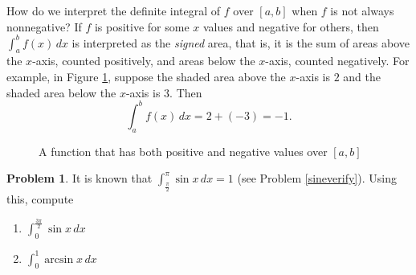\documentclass[12pt,letterpaper]{book}
\numberwithin{equation}{section}
\theoremstyle{definition}
\newtheorem{problem}[thm]{\textbf{Problem}}
\begin{document}
How do we interpret the definite integral of $f$ over $[a,b]$ when $f$ is not always nonnegative? If $f$ is positive for some $x$ values and negative for others, then $\displaystyle{\int_a^b f(x)\,dx}$ is interpreted as the \textit{signed} area, that is, it is the sum of areas above the $x$-axis, counted positively, and areas below the $x$-axis, counted negatively. For example, in Figure \ref{positive and negative}, suppose the shaded area above the $x$-axis is $2$ and the shaded area below the $x$-axis is $3$. Then
$$\int_{a}^bf(x)\,dx=2+(-3)=-1.$$

\begin{figure}[h]
\begin{center}
\caption{A function that has both positive and negative values over $[a,b]$}
\label{positive and negative}
\end{center}
\end{figure}

\begin{problem}\label{sineknown} It is known that $\displaystyle{\int_{\frac{\pi}{2}}^\pi \sin x\,dx=1}$  (see Problem \ref{sineverify}). Using this, compute
\begin{enumerate}
\item $\displaystyle{\int_{0}^\frac{3\pi}{2} \sin x\,dx}$
\item $\displaystyle{\int_{0}^1 \arcsin x\,dx}$
\end{enumerate}
\end{problem}
\end{document}
